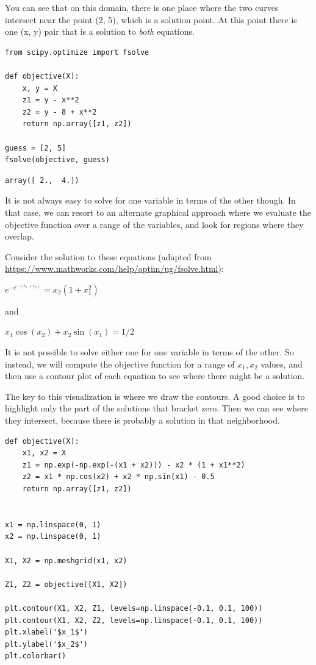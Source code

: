 \documentclass[11pt]{article}
\begin{document}
You can see that on this domain, there is one place where the two curves intersect near the point (2, 5), which is a solution point. At this point there is one (x, y) pair that is a solution to \emph{both} equations.

\begin{verbatim}
from scipy.optimize import fsolve

def objective(X):
    x, y = X
    z1 = y - x**2
    z2 = y - 8 + x**2
    return np.array([z1, z2])

guess = [2, 5]
fsolve(objective, guess)
\end{verbatim}

\begin{verbatim}
array([ 2.,  4.])
\end{verbatim}

It is not always easy to solve for one variable in terms of the other though. In that case, we can resort to an alternate graphical approach where we evaluate the objective function over a range of the variables, and look for regions where they overlap.

Consider the solution to these equations (adapted from \url{https://www.mathworks.com/help/optim/ug/fsolve.html}):

\(e^{-e^{-(x_1 + x_2)}} = x_2 (1 + x_1^2)\)

and

\(x_1 \cos(x_2) + x_2 \sin(x_1) = 1/2\)

It is not possible to solve either one for one variable in terms of the other. So instead, we will compute the objective function for a range of \(x_1, x_2\) values, and then use a contour plot of each equation to see where there might be a solution.

The key to this visualization is where we draw the contours. A good choice is to highlight only the part of the solutions that bracket zero. Then we can see where they intersect, because there is probably a solution in that neighborhood.

\begin{verbatim}
def objective(X):
    x1, x2 = X
    z1 = np.exp(-np.exp(-(x1 + x2))) - x2 * (1 + x1**2)
    z2 = x1 * np.cos(x2) + x2 * np.sin(x1) - 0.5
    return np.array([z1, z2])


x1 = np.linspace(0, 1)
x2 = np.linspace(0, 1)

X1, X2 = np.meshgrid(x1, x2)

Z1, Z2 = objective([X1, X2])

plt.contour(X1, X2, Z1, levels=np.linspace(-0.1, 0.1, 100))
plt.contour(X1, X2, Z2, levels=np.linspace(-0.1, 0.1, 100))
plt.xlabel('$x_1$')
plt.ylabel('$x_2$')
plt.colorbar()
\end{verbatim}
\end{document}
